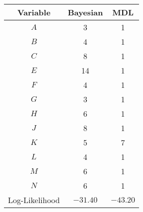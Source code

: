 \scriptsize
\begin{tabular}{@{}ccc@{}}
\toprule
Variable   & Bayesian & MDL          \\
\midrule
$A$    & 3        & 1      \\
$B$    & 4        & 1      \\
$C$    & 8        & 1      \\
$E$    & 14       & 1      \\
$F$    & 4        & 1      \\
$G$    & 3        & 1      \\
$H$    & 6        & 1      \\
$J$    & 8        & 1      \\
$K$    & 5        & 7      \\
$L$    & 4        & 1      \\
$M$    & 6        & 1      \\
$N$    & 6        & 1      \\
\addlinespace[0.5em]
Log-Likelihood   & $-31.40$   & $-43.20$ \\
\bottomrule
\end{tabular}
